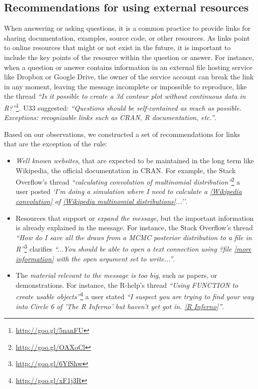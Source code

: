 \documentclass{sig-alternate-05-2015}
\begin{document}
\subsection{Recommendations for using external resources}

	When answering or asking questions, it is a common practice to provide links for sharing documentation, examples, source code, or other resources.
	As links point to online resources that might or not exist in the future, it is important to include the key points of the resource within the question or answer.
	For instance, when a question or answer contains information in an external file hosting service like Dropbox or Google Drive, the owner of the service account can break the link in any moment, leaving the message incomplete or impossible to reproduce, like the thread \textit{``Is it possible to create a 3d contour plot without continuous data in R?''}\footnote{\url{http://goo.gl/5nanFU}}.
	U33 suggested: \textit{``Questions should be self-contained as much as possible. Exceptions: recognizable links such as CRAN, R documentation, etc.''}.

	Based on our observations, we constructed a set of recommendations for links that are the exception of the rule:

	\begin{itemize}
		\item \emph{Well known websites}, that are expected to be maintained in the long term like Wikipedia, the official documentation in CRAN.
		For example, the Stack Overflow's thread \textit{``calculating convolution of multinomial distribution''}\footnote{\url{http://goo.gl/OAXoCl}} a user posted \textit{`I'm doing a simulation where I need to calculate a \href{https://en.wikipedia.org/wiki/Convolution_of_probability_distributions}{[Wikipedia convolution]} of \href{https://en.wikipedia.org/wiki/Multinomial_distribution}{[Wikipedia multinomial distributions]}...''}.

		\item Resources that support or \emph{expand the message}, but the important information is already explained in the message.
		For instance, the Stack Overflow's thread \textit{``How do I save all the draws from a MCMC posterior distribution to a file in R''}\footnote{\url{http://goo.gl/6YfShw}} clarifies \textit{``...You should be able to open a text connection using ?file \href{http://stat.ethz.ch/R-manual/R-devel/library/base/html/connections.html}{[more information]} with the open argument set to write...''}.

		\item The \emph{material relevant to the message is too big}, such as papers, or demonstrations.
		For instance, the R-help's thread \textit{``Using FUNCTION to create usable objects''}\footnote{\url{http://goo.gl/xF1j3R}} a user stated \textit{``I suspect you are trying to find your way into Circle 6 of 'The R Inferno' but haven't yet got in. \href{http://www.burns-stat.com/pages/Tutor/R\_inferno.pdf}{[R Inferno]}''}.
	\end{itemize}
\end{document}
